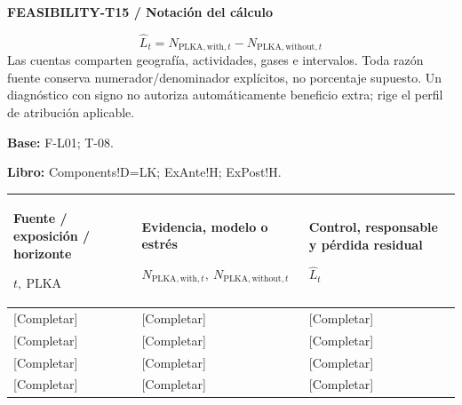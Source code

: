 \par\begingroup\sffamily\fontsize{8}{10}\selectfont\color{NEBGreen}\setlength{\parskip}{2pt}\setlength{\abovedisplayskip}{4pt}\setlength{\belowdisplayskip}{4pt}\setlength{\abovedisplayshortskip}{2pt}\setlength{\belowdisplayshortskip}{3pt}
\textbf{FEASIBILITY-T15 / Notación del cálculo}\par
{\fontsize{9}{11}\selectfont\[ \widehat L_t=N_{\mathrm{PLKA,with},t}-N_{\mathrm{PLKA,without},t} \]}
Las cuentas comparten geografía, actividades, gases e intervalos. Toda razón fuente conserva numerador/denominador explícitos, no porcentaje supuesto. Un diagnóstico con signo no autoriza automáticamente beneficio extra; rige el perfil de atribución aplicable.\par
\textbf{Base:} F-L01; T-08.\par
\textbf{Libro:} Components!D=LK; ExAnte!H; ExPost!H.\par\endgroup
{\sffamily\fontsize{8.3}{10.3}\selectfont\begin{longtable}{@{}P{51.14mm} P{57.74mm} P{56.09mm}@{}}
\toprule
\textbf{Fuente / exposición / horizonte}\par {\normalfont\fontsize{8.2}{10}\selectfont $t,\ \mathrm{PLKA}$} & \textbf{Evidencia, modelo o estrés}\par {\normalfont\fontsize{8.2}{10}\selectfont $N_{\mathrm{PLKA,with},t},\ N_{\mathrm{PLKA,without},t}$} & \textbf{Control, responsable y pérdida residual}\par {\normalfont\fontsize{8.2}{10}\selectfont $\widehat L_t$}\\\midrule\endhead
\rule{0pt}{7.7mm}[Completar] & [Completar] & [Completar]\\\hline
\rule{0pt}{7.7mm}[Completar] & [Completar] & [Completar]\\\hline
\rule{0pt}{7.7mm}[Completar] & [Completar] & [Completar]\\\hline
\rule{0pt}{7.7mm}[Completar] & [Completar] & [Completar]\\\hline
\end{longtable}}
